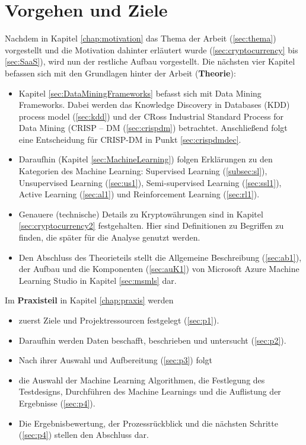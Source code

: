 \chapter{Vorgehen und Ziele}\label{chapter:Vorgehen}
Nachdem in Kapitel \ref{chap:motivation} das Thema der Arbeit (\ref{sec:thema}) vorgestellt und die Motivation dahinter erläutert wurde (\ref{sec:cryptocurrency} bis \ref{sec:SaaS}), wird nun der restliche Aufbau vorgestellt.
Die nächsten vier Kapitel befassen sich mit den Grundlagen hinter der Arbeit (\textbf{Theorie}): 
\begin{itemize}
\item Kapitel \ref{sec:DataMiningFrameworks} befasst sich mit Data Mining Frameworks. Dabei werden das Knowledge Discovery in Databases (KDD) process model (\ref{sec:kdd}) und der CRoss Industrial Standard Process for Data Mining (CRISP – DM (\ref{sec:crispdm}) betrachtet. Anschließend folgt eine Entscheidung für CRISP-DM in Punkt \ref{sec:crispdmdec}.
\item Daraufhin (Kapitel \ref{sec:MachineLearning}) folgen Erklärungen zu den Kategorien des Machine Learning: Supervised Learning (\ref{subsec:sl}), Unsupervised Learning (\ref{sec:us1}), Semi-supervised Learning (\ref{sec:ssl1}), Active Learning (\ref{sec:al1}) und Reinforcement Learning (\ref{sec:rl1}).
\item Genauere (technische) Details zu Kryptowährungen sind in Kapitel \ref{sec:cryptocurrency2} festgehalten. Hier sind Definitionen zu Begriffen zu finden, die später für die Analyse genutzt werden.
\item Den Abschluss des Theorieteils stellt die Allgemeine Beschreibung (\ref{sec:ab1}), der Aufbau und die Komponenten (\ref{sec:auK1}) von Microsoft Azure Machine Learning Studio in Kapitel \ref{sec:msmls} dar.
\end{itemize}
Im \textbf{Praxisteil} in Kapitel \ref{chap:praxis} werden
\begin{itemize}
\item zuerst Ziele und Projektressourcen festgelegt (\ref{sec:p1}).
\item Daraufhin werden Daten beschafft, beschrieben und untersucht (\ref{sec:p2}).
\item Nach ihrer Auswahl und Aufbereitung (\ref{sec:p3}) folgt
\item die Auswahl der Machine Learning Algorithmen, die Festlegung des Testdesigns, Durchführen des Machine Learnings und die Auflistung der Ergebnisse (\ref{sec:p4}).
\item Die Ergebnisbewertung, der Prozessrückblick und die nächsten Schritte (\ref{sec:p4}) stellen den Abschluss dar.
\end{itemize}
